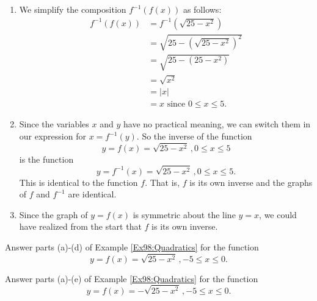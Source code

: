 \documentclass{ximera}
\begin{document}
\begin{example}
\begin{explanation}
\begin{enumerate}
\item We simplify the composition $f^{-1}(f(x))$ as follows:
\begin{align*}
           f^{-1}(f(x)) &= f^{-1}(\sqrt{25-x^2})   \\
                             &= \sqrt{25 - \left( \sqrt{25-x^2}\right)^2}  \\
                             &= \sqrt{25 - (25-x^2)}  \\
                             &= \sqrt{x^2} \\
                             &= |x|  \\
                             &= x \text{ since } 0\leq x \leq 5.
\end{align*}

\item Since the variables $x$ and $y$ have no practical meaning, we can switch them in our expression for $x = f^{-1}(y)$. So the inverse of the function
\[
    y=   f(x) = \sqrt{25-x^2} \, , 0\leq x \leq 5 
\]
is the function
\[
    y = f^{-1}(x) = \sqrt{25-x^2} \, , 0\leq x \leq 5 .
\]
This is identical to the function $f$. That is, $f$ is its own inverse and the graphs of $f$ and $f^{-1}$ are identical.

\item Since the graph of $y=f(x)$ is symmetric about the line $y=x$, we could have realized from the start that $f$ is its own inverse.

\end{enumerate}

\end{explanation}

\end{example}

\begin{example}  \label{Ex97:Quadratics}
Answer parts (a)-(d) of Example \ref{Ex98:Quadratics} for the function
\[
    y=   f(x) = \sqrt{25-x^2} \, , -5 \leq x \leq 0 .
\]

\end{example}

\begin{example}  \label{Ex96:Quadratics}
Answer parts (a)-(e) of Example \ref{Ex98:Quadratics} for the function
\[
    y=   f(x) = - \sqrt{25-x^2} \, , -5 \leq x \leq 0 .
\]

\end{example}
\end{document}

